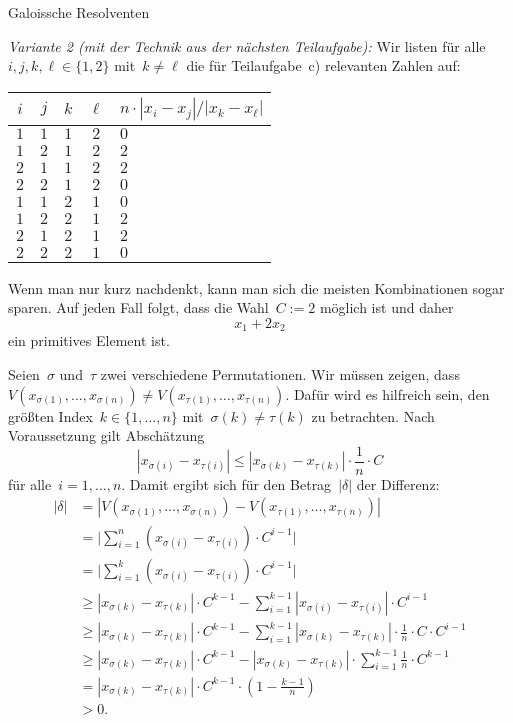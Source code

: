 \documentclass{algblatt}
\begin{document}
\begin{aufgabe}{Galoissche Resolventen}
\begin{loesungE}
\emph{Variante 2 (mit der Technik aus der nächsten Teilaufgabe):} Wir listen
für alle~$i,j,k,\ell \in \{ 1, 2 \}$ mit~$k \neq \ell$ die für Teilaufgabe~c)
relevanten Zahlen auf:
\begin{center}
  \begin{tabular}{c|c|c|c|l}
    $i$ & $j$ & $k$ & $\ell$ & $n \cdot |x_i - x_j| / |x_k - x_\ell|$ \\\hline
    $1$ & $1$ & $1$ & $2$ & $0$ \\
    $1$ & $2$ & $1$ & $2$ & $2$ \\
    $2$ & $1$ & $1$ & $2$ & $2$ \\
    $2$ & $2$ & $1$ & $2$ & $0$ \\
    $1$ & $1$ & $2$ & $1$ & $0$ \\
    $1$ & $2$ & $2$ & $1$ & $2$ \\
    $2$ & $1$ & $2$ & $1$ & $2$ \\
    $2$ & $2$ & $2$ & $1$ & $0$
  \end{tabular}
\end{center}
Wenn man nur kurz nachdenkt, kann man sich die meisten Kombinationen sogar
sparen. Auf jeden Fall folgt, dass die Wahl~$C := 2$ möglich ist und daher
\[ x_1 + 2 x_2 \]
ein primitives Element ist.

\item Seien~$\sigma$ und~$\tau$ zwei verschiedene Permutationen. Wir müssen
zeigen, dass~$V(x_{\sigma(1)},\ldots,x_{\sigma(n)}) \neq
V(x_{\tau(1)},\ldots,x_{\tau(n)})$. Dafür wird es hilfreich sein, den größten
Index~$k \in \{ 1,\ldots,n \}$ mit~$\sigma(k) \neq \tau(k)$ zu betrachten. Nach
Voraussetzung gilt Abschätzung
\[ |x_{\sigma(i)} - x_{\tau(i)}| \leq
  |x_{\sigma(k)} - x_{\tau(k)}| \cdot
  \frac{1}{n} \cdot C \]
für alle~$i = 1,\ldots,n$. Damit ergibt sich für den Betrag~$|\delta|$ der
Differenz:
\begin{align*}
  |\delta| &= |V(x_{\sigma(1)},\ldots,x_{\sigma(n)}) -
  V(x_{\tau(1)},\ldots,x_{\tau(n)})| \\
  &=
  \Biggl|\sum_{i=1}^n (x_{\sigma(i)} - x_{\tau(i)}) \cdot C^{i-1}\Biggr| \\
  &= \Biggl|\sum_{i=1}^k (x_{\sigma(i)} - x_{\tau(i)}) \cdot C^{i-1}\Biggr| \\
  &\geq |x_{\sigma(k)} - x_{\tau(k)}| \cdot C^{k-1} - \sum_{i=1}^{k-1}
  |x_{\sigma(i)} - x_{\tau(i)}| \cdot C^{i-1}\\
  &\geq |x_{\sigma(k)} - x_{\tau(k)}| \cdot C^{k-1} - \sum_{i=1}^{k-1}
  |x_{\sigma(k)} - x_{\tau(k)}| \cdot \frac{1}{n} \cdot C \cdot C^{i-1} \\
  &\geq |x_{\sigma(k)} - x_{\tau(k)}| \cdot C^{k-1} - |x_{\sigma(k)} -
  x_{\tau(k)}| \cdot \sum_{i=1}^{k-1}
  \frac{1}{n} \cdot C^{k-1} \\
  &= |x_{\sigma(k)} - x_{\tau(k)}| \cdot C^{k-1} \cdot \left(1 -
  \frac{k-1}{n}\right) \\
  &> 0.
\end{align*}
\end{loesungE}
\end{aufgabe}
\end{document}
